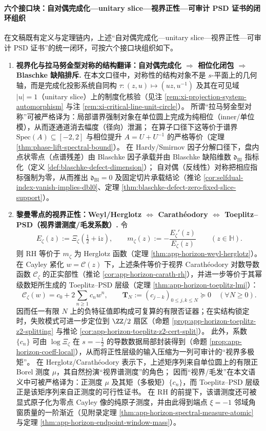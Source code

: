 \paragraph{六个接口块：自对偶完成化—unitary slice—视界正性—可审计 PSD 证书的闭环组织}
在文稿既有定义与定理链内，上述“自对偶完成化—unitary slice—视界正性—可审计 PSD 证书”的统一闭环，可按六个接口块组织如下。
\begin{enumerate}
  \item \textbf{视界化与拉马努金型对称的结构翻译：自对偶完成化 \(\Rightarrow\) 相位化闭包 \(\Rightarrow\) Blaschke 缺陷排斥.}
  在本文口径中，对称性的结构对象不是 \(s\)-平面上的几何轴，而是完成化投影系统自同构
  \(\tau:(z,u)\mapsto(uz,u^{-1})\) 及其在可见域 \(|u|=1\)（unitary slice）上的制度化核验（见注 \ref{rem:xi-projection-system-automorphism} 与注 \ref{rem:xi-critical-line-unit-circle}）。
  所谓“拉马努金型对称”可被严格译为：局部谱界强制对象在单位圆上完成为纯相位（inner/单位模），从而逐通道消去幅度（径向）泄漏；
  在算子口径下这等价于谱界 \(\mathrm{Spec}(A)\subseteq[-2,2]\) 与相位提升 \(A=U+U^{-1}\) 的严格等价（定理 \ref{thm:phase-lift-spectral-bound}）。
  在 Hardy/Smirnov 因子分解口径下，盘内点状零点（点谱残差）由 Blaschke 因子承载并由 Blaschke 缺陷维数 \(\mathfrak d_{\mathrm{Bl}}\) 指标化（定义 \ref{def:blaschke-defect-dimension}）；
  自对偶（反线性）对称把相应指标强制为零，从而推出 \(\mathfrak d_{\mathrm{Bl}}=0\) 及固定切片承载结论（推论 \ref{cor:selfdual-index-vanish-implies-dbl0}、定理 \ref{thm:blaschke-defect-zero-fixed-slice-support}）。

  \item \textbf{黎曼零点的视界正性：Weyl/Herglotz \(\Leftrightarrow\) Carath\'eodory \(\Leftrightarrow\) Toeplitz--PSD（视界谱测度/毛发系数）.}
  令
  \[
    E_{\zeta}(z):=\Xi_{\zeta}\!\left(\tfrac12+\mathrm{i}z\right),\qquad
    m_{\zeta}(z):=-\frac{E_{\zeta}'(z)}{E_{\zeta}(z)}\qquad(z\in\mathbb{H}).
  \]
  则 RH 等价于 \(m_{\zeta}\) 为 Herglotz 函数（定理 \ref{thm:app-horizon-weyl-herglotz}）。
  在 Cayley 紧化 \(w=\mathcal{C}(z)\) 下，上述条件等价于视界 Carath\'eodory 对数导数函数 \(\mathscr{C}_{\zeta}\) 的正实部性（推论 \ref{cor:app-horizon-carath-rh}），并进一步等价于其幂级数矩所生成的 Toeplitz--PSD 层级（定理 \ref{thm:app-horizon-toeplitz-lmi}）：
  \[
    \mathscr{C}_{\zeta}(w)=c_0+2\sum_{n\ge 1}c_n w^n,
    \qquad
    \mathbf{T}_N:=(c_{j-k})_{0\le j,k\le N}\succeq 0\quad(\forall N\ge 0).
  \]
  因而任一有限 \(N\) 上的负特征值即构成可复算的有限否证器；在实结构锁定时，失败模式可进一步定位到 \(\ZZ/2\) 扇区（命题 \ref{prop:app-horizon-toeplitz-z2-splitting} 与推论 \ref{cor:app-horizon-toeplitz-z2-cert-split}）。
  此外，系数 \(\{c_n\}\) 可由 \(\log\Xi_{\zeta}\) 在 \(s=-\tfrac12\) 的导数数据局部封装得到（命题 \ref{prop:app-horizon-coeff-local}），从而将正性层级的输入压缩为一列可审计的“视界多极矩”。
  在 Herglotz/Carath\'eodory 表示下，上述矩序列来自单位圆上的有限正 Borel 测度 \(\mu\)，其自然扮演“视界谱测度”的角色；
  因而“视界/毛发”在本文语义中可被严格译为：正测度 \(\mu\) 及其矩（多极矩）\(\{c_n\}\)，而 Toeplitz--PSD 层级正是该矩序列来自正测度的可行性证书。
  在 RH 的前提下，该谱测度还可被显式原子化为零点 Cayley 像的纯原子测度，并由此得到端点 \(\xi=-1\) 邻域角窗质量的一阶渐近（见附录定理 \ref{thm:app-horizon-spectral-measure-atomic} 与定理 \ref{thm:app-horizon-endpoint-window-mass}）。


\end{enumerate}
